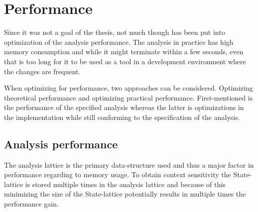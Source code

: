 \newpage
\section{Performance}
\label{sec:future3}

Since it was not a goal of the thesis, not much though has been put into optimization of the analysis performance. The analysis in practice has high memory consumption and while it might terminate within a few seconds, even that is too long for it to be used as a tool in a development environment where the changes are frequent.  

When optimizing for performance, two approaches can be considered. Optimizing theoretical performance and optimizing practical performance. First-mentioned is the performance of the specified analysis whereas the latter is optimizations in the implementation while still conforming to the specification of the analysis.

\subsection{Analysis performance}
The analysis lattice is the primary data-structure used and thus a major factor in performance regarding to memory usage. To obtain context sensitivity the State-lattice is stored multiple times in the analysis lattice and because of this minimizing the size of the State-lattice potentially results in multiple times the performance gain.

